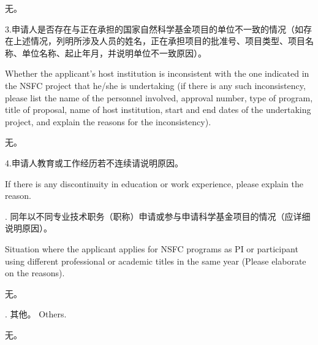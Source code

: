 \documentclass[12pt,UTF8,AutoFakeBold=4,a4paper]{ctexart}
\begin{document}
\bigskip

无。

\bigskip

{\sihao \color{MsBlue} \kaishu 3.申请人是否存在与正在承担的国家自然科学基金项目的单位不一致的情况（如存在上述情况，列明所涉及人员的姓名，正在承担项目的批准号、项目类型、项目名称、单位名称、起止年月，并说明单位不一致原因）。}

\bigskip

{\color{MsBlue} \xiaosihao {} 
Whether the applicant's host institution is inconsistent with the one indicated in the NSFC project that he/she is undertaking (if there is any such inconsistency, please list the name of the personnel involved, approval number, type of program, title of proposal, name of host institution, start and end dates of the undertaking project, and explain the reasons for the inconsistency).}

\bigskip

无。

\bigskip

{\sihao \color{MsBlue} \kaishu 4.申请人教育或工作经历若不连续请说明原因。}

\bigskip

{\color{MsBlue} \xiaosihao {} 
If there is any discontinuity in education or work experience, please explain the reason.}

{\sihao \color{MsBlue} . 同年以不同专业技术职务（职称）申请或参与申请科学基金项目的情况（应详细说明原因）。 

\bigskip

\xiaosihao {} Situation where the applicant applies for NSFC programs as PI or participant using different professional or academic titles in the same year (Please elaborate on the reasons).}

\bigskip

无。

\bigskip

{\sihao \color{MsBlue} . 其他。 
\xiaosihao {} Others.}

\bigskip

无。

\bigskip
\end{document}
